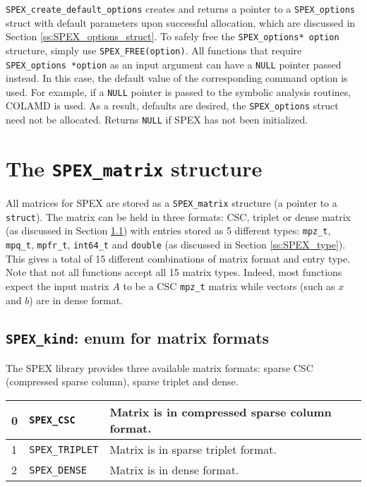\documentclass[12pt]{report}
\theoremstyle{definition}
\begin{document}
\verb|SPEX_create_default_options| creates and returns a pointer to a
\verb|SPEX_options| struct with default parameters upon successful allocation,
which are discussed in Section \ref{ss:SPEX_options_struct}.  To safely free
the \verb|SPEX_options* option| structure, simply use \newline \verb|SPEX_FREE(option)|.
All functions that require \verb|SPEX_options *option| as an input argument can
have a \verb'NULL' pointer passed instead. In this case, the default value of
the corresponding command option is used. For example, if a \verb'NULL' pointer
is passed to the symbolic analysis routines, COLAMD is used. As a result,
defaults are desired, the \verb|SPEX_options| struct need not be allocated.
Returns \verb|NULL| if SPEX has not been initialized.

\cprotect\section{The \verb|SPEX_matrix| structure} \label{ss:SPEX_matrix}

All matrices for SPEX are stored as a \verb|SPEX_matrix| structure (a pointer
to a \verb'struct').  The matrix can be held in three formats: CSC, triplet or
dense matrix (as discussed in Section \ref{ss:SPEX_kind}) with entries stored
as 5 different types: \verb|mpz_t|, \verb|mpq_t|, \verb|mpfr_t|, \verb|int64_t|
and \verb|double| (as discussed in Section \ref{ss:SPEX_type}).  This gives a
total of 15 different combinations of matrix format and entry type. Note that
not all functions accept all 15 matrix types. Indeed, most functions expect the
input matrix $A$ to be a CSC \verb|mpz_t| matrix while vectors (such as $x$ and
$b$) are in dense format.

\cprotect\subsection{\verb|SPEX_kind|: enum for matrix formats}
\label{ss:SPEX_kind}

The SPEX library provides three available matrix formats: sparse CSC
(compressed sparse column), sparse triplet and dense.

{\small
\begin{center}
\begin{tabular}{llp{4in}}
\hline
0 & \verb|SPEX_CSC| & Matrix is in compressed sparse column format. \\
\hline
1 & \verb|SPEX_TRIPLET|      & Matrix is in sparse triplet format. \\
\hline
2 & \verb|SPEX_DENSE|        & Matrix is in dense format.\\
\hline
\end{tabular}
\label{tab:SPEX_kind}
\end{center}
}
\end{document}
